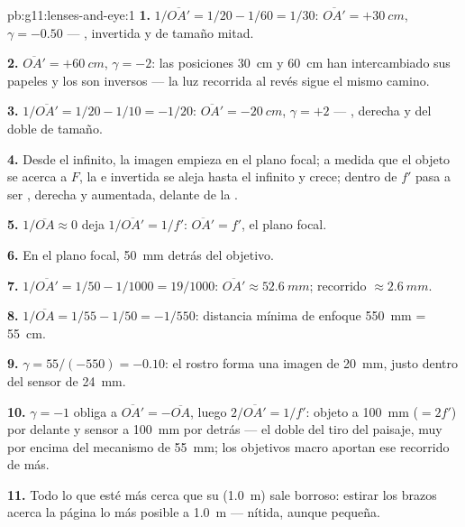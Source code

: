 \begin{solution}{pb:g11:lenses-and-eye:1}
\textbf{1.} $1/\overline{OA'} = 1/20 - 1/60 = 1/30$:
$\overline{OA'} = +\qty{30}{cm}$, $\gamma = -0.50$ --- , invertida y
de tamaño mitad.

\textbf{2.} $\overline{OA'} = +\qty{60}{cm}$, $\gamma = -2$: las
posiciones \qty{30}{cm} y \qty{60}{cm} han intercambiado sus papeles y
los  son inversos --- la luz recorrida al revés sigue el mismo
camino.

\textbf{3.} $1/\overline{OA'} = 1/20 - 1/10 = -1/20$:
$\overline{OA'} = \qty{-20}{cm}$, $\gamma = +2$ --- , derecha y
del doble de tamaño.

\textbf{4.} Desde el infinito, la imagen empieza en el plano focal; a
medida que el objeto se acerca a $F$, la  e invertida se aleja
hasta el infinito y crece; dentro de $f'$ pasa a ser , derecha y
aumentada, delante de la .

\textbf{5.} $1/\overline{OA} \approx 0$ deja
$1/\overline{OA'} = 1/f'$: $\overline{OA'} = f'$, el plano focal.

\textbf{6.} En el plano focal, \qty{50}{mm} detrás del objetivo.

\textbf{7.} $1/\overline{OA'} = 1/50 - 1/1000 = 19/1000$:
$\overline{OA'} \approx \qty{52.6}{mm}$; recorrido
$\approx \qty{2.6}{mm}$.

\textbf{8.} $1/\overline{OA} = 1/55 - 1/50 = -1/550$: distancia mínima
de enfoque \qty{550}{mm} = \qty{55}{cm}.

\textbf{9.} $\gamma = 55/(-550) = -0.10$: el rostro forma una imagen de
\qty{20}{mm}, justo dentro del sensor de \qty{24}{mm}.

\textbf{10.} $\gamma = -1$ obliga a
$\overline{OA'} = -\overline{OA}$, luego $2/\overline{OA'} = 1/f'$:
objeto a \qty{100}{mm} ($= 2f'$) por delante y sensor a \qty{100}{mm}
por detrás --- el doble del tiro del paisaje, muy por encima del
mecanismo de \qty{55}{mm}; los objetivos macro aportan ese recorrido de
más.

\textbf{11.} Todo lo que esté más cerca que su 
(\qty{1.0}{m}) sale borroso: estirar los brazos acerca la página lo más
posible a \qty{1.0}{m} --- nítida, aunque pequeña.


\end{solution}
